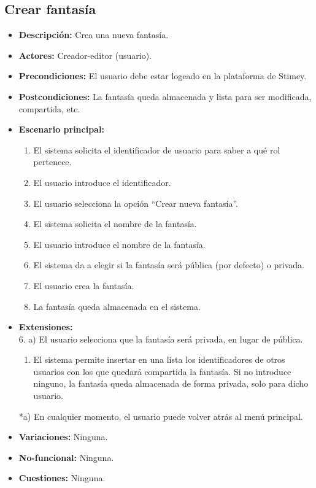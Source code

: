 \documentclass[12pt,letterpaper]{article}
\begin{document}
\subsection{Crear fantasía}
\hypertarget{crearfantasia}{}
\begin{itemize}
	\item \textbf{Descripción:} Crea una nueva fantasía.
	\item \textbf{Actores:} Creador-editor (usuario).
	\item \textbf{Precondiciones:} El usuario debe estar logeado en la plataforma de Stimey.
	\item \textbf{Postcondiciones:} La fantasía queda almacenada y lista para ser modificada, compartida, etc.
	\item \textbf{Escenario principal:}
	\begin{enumerate}
		\item El sistema solicita el identificador de usuario para saber a qué rol pertenece.
		\item El usuario introduce el identificador.
		\item El usuario selecciona la opción ``Crear nueva fantasía''.
		\item El sistema solicita el nombre de la fantasía.
		\item El usuario introduce el nombre de la fantasía.
		\item El sistema da a elegir si la fantasía será pública (por defecto) o privada.
		\item El usuario crea la fantasía.
		\item La fantasía queda almacenada en el sistema.
	\end{enumerate}
	\item \textbf{Extensiones:} \\6. a) El usuario selecciona que la fantasía será privada, en lugar de pública.
	\begin{enumerate}
		\item El sistema permite insertar en una lista los identificadores de otros usuarios con los que quedará compartida la fantasía. Si no introduce ninguno, la fantasía queda almacenada de forma privada, solo para dicho usuario.
	\end{enumerate}
	*a) En cualquier momento, el usuario puede volver atrás al menú principal.
	\item \textbf{Variaciones:} Ninguna.
	\item \textbf{No-funcional:} Ninguna.
	\item \textbf{Cuestiones:} Ninguna.
\end{itemize}
\end{document}

